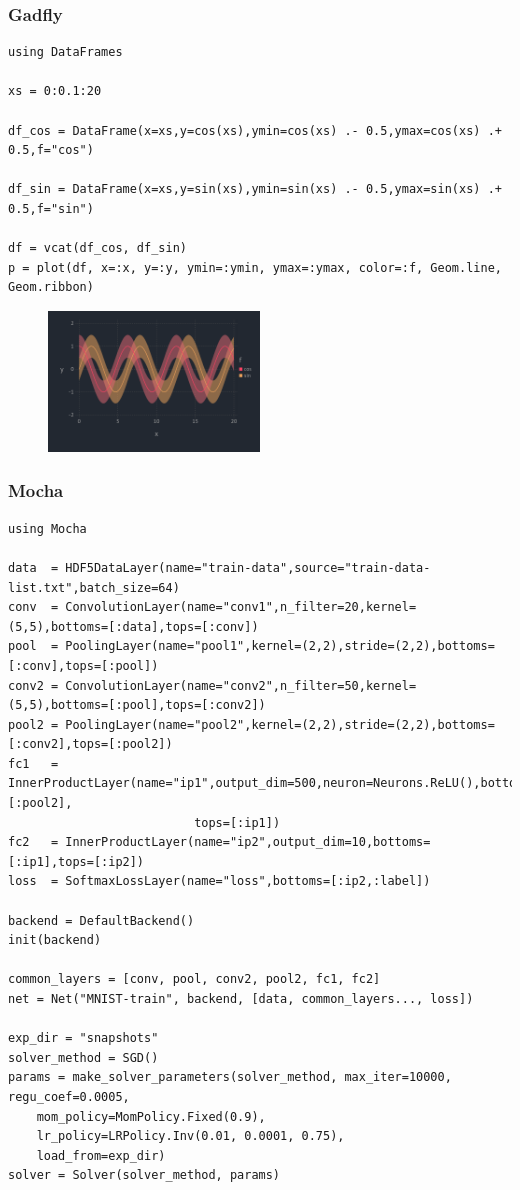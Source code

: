 \begin{frame}[fragile]
	\frametitle{Gadfly}
  \begin{tiny}
  \begin{verbatim}
using DataFrames

xs = 0:0.1:20

df_cos = DataFrame(x=xs,y=cos(xs),ymin=cos(xs) .- 0.5,ymax=cos(xs) .+ 0.5,f="cos")

df_sin = DataFrame(x=xs,y=sin(xs),ymin=sin(xs) .- 0.5,ymax=sin(xs) .+ 0.5,f="sin")

df = vcat(df_cos, df_sin)
p = plot(df, x=:x, y=:y, ymin=:ymin, ymax=:ymax, color=:f, Geom.line, Geom.ribbon)
  \end{verbatim}
  \end{tiny}
  \begin{figure}[ht]
    \centering
    \includegraphics[width=0.5\textwidth]{gadfly3}
  \end{figure}
\end{frame}

\begin{frame}[fragile]
	\frametitle{Mocha}
  \begin{tiny}
  \begin{verbatim}
using Mocha

data  = HDF5DataLayer(name="train-data",source="train-data-list.txt",batch_size=64)
conv  = ConvolutionLayer(name="conv1",n_filter=20,kernel=(5,5),bottoms=[:data],tops=[:conv])
pool  = PoolingLayer(name="pool1",kernel=(2,2),stride=(2,2),bottoms=[:conv],tops=[:pool])
conv2 = ConvolutionLayer(name="conv2",n_filter=50,kernel=(5,5),bottoms=[:pool],tops=[:conv2])
pool2 = PoolingLayer(name="pool2",kernel=(2,2),stride=(2,2),bottoms=[:conv2],tops=[:pool2])
fc1   = InnerProductLayer(name="ip1",output_dim=500,neuron=Neurons.ReLU(),bottoms=[:pool2],
                          tops=[:ip1])
fc2   = InnerProductLayer(name="ip2",output_dim=10,bottoms=[:ip1],tops=[:ip2])
loss  = SoftmaxLossLayer(name="loss",bottoms=[:ip2,:label])

backend = DefaultBackend()
init(backend)

common_layers = [conv, pool, conv2, pool2, fc1, fc2]
net = Net("MNIST-train", backend, [data, common_layers..., loss])

exp_dir = "snapshots"
solver_method = SGD()
params = make_solver_parameters(solver_method, max_iter=10000, regu_coef=0.0005,
    mom_policy=MomPolicy.Fixed(0.9),
    lr_policy=LRPolicy.Inv(0.01, 0.0001, 0.75),
    load_from=exp_dir)
solver = Solver(solver_method, params)
  \end{verbatim}
  \end{tiny}
\end{frame}

